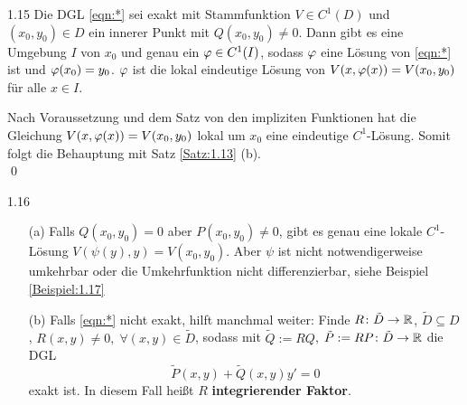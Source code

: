 \documentclass[a4paper]{article}
\begin{document}
\begin{Kor}{}{1.15}
Die DGL \eqref{eqn:*} sei exakt mit Stammfunktion $V\in C^1(D)$ und $(x_0,y_0)\in D$ ein innerer Punkt mit $Q(x_0,y_0)\ne 0$. Dann gibt es eine Umgebung $I$ von $x_0$ und genau ein $\operatorname{\varphi}\in C^1(I)$, sodass $\operatorname{\varphi}$ eine Lösung von \eqref{eqn:*} ist und $\operatorname{\varphi}(x_0)=y_0$.
$\operatorname{\varphi}$ ist die lokal eindeutige Lösung von $V(x,\operatorname{\varphi}(x))=V(x_0,y_0)$ für alle $x\in I$.
\end{Kor}
\begin{Beweis}
Nach Voraussetzung und dem Satz von den impliziten Funktionen hat die Gleichung $V(x,\operatorname{\varphi}(x))=V(x_0,y_0)$ lokal um $x_0$ eine eindeutige $C^1$-Lösung. Somit folgt die Behauptung mit Satz \ref{Satz:1.13} (b).\\\qed
\end{Beweis}

\begin{Bemerkung}{}{1.16}
\begin{itemize}
    \item[(a)] Falls $Q(x_0,y_0)=0$ aber $P(x_0,y_0)\ne 0$, gibt es genau eine lokale $C^1$-Lösung $V(\psi(y),y)=V(x_0,y_0)$. Aber $\psi$ ist nicht notwendigerweise umkehrbar oder die Umkehrfunktion nicht differenzierbar, siehe Beispiel \ref{Beispiel:1.17}
    \item[(b)] Falls \eqref{eqn:*} nicht exakt, hilft manchmal weiter: Finde $R\colon \tilde{D}\to\mathbb R$, $\tilde{D}\subseteq D$, $R(x,y)\ne 0,\;\forall (x,y)\in\tilde{D}$, sodass mit $\tilde{Q}:=RQ$, $\tilde{P}:=RP\colon \tilde{D}\to\mathbb R$ die DGL
    \[\tilde{P}(x,y)+\tilde{Q}(x,y)y'=0\]
    exakt ist. In diesem Fall heißt $R$ \textbf{integrierender Faktor}.
\end{itemize}
\end{Bemerkung}
\end{document}
